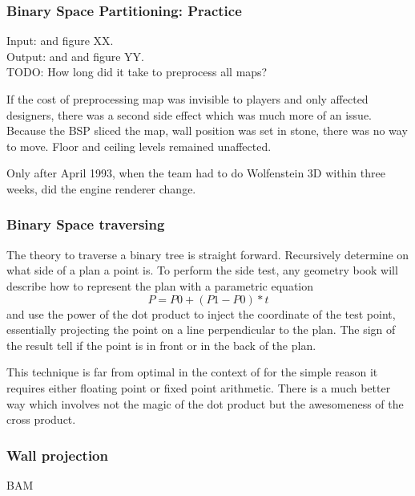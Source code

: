 \subsubsection{Binary Space Partitioning: Practice}
Input: and  figure XX.\\
Output: and  and  figure YY.\\
TODO: How long did it take to preprocess all maps?\\
\par
If the cost of preprocessing map was invisible to players and only affected designers, there was a second side effect which was much more of an issue. Because the BSP sliced the map, wall position was set in stone, there was no way to move. Floor and ceiling levels remained unaffected.\\
\par
Only after April 1993, when the team had to do Wolfenstein 3D within three weeks, did the engine renderer change.\\

\par

\subsubsection{Binary Space traversing}
The theory to traverse a binary tree is straight forward. Recursively determine on what side of a plan a point is. To perform the side test, any geometry book will describe how to represent the plan with a parametric equation $$ P = P0 + (P1 - P0) * t$$
and use the power of the dot product to inject the coordinate of the test point, essentially projecting the point on a line perpendicular to the plan. The sign of the result tell if the point is in front or in the back of the plan.\\
\par
This technique is far from optimal in the context of \doom for the simple reason it requires either floating point or fixed point arithmetic. There is a much better way which involves not the magic of the dot product but the awesomeness of the cross product.\\
\par
{}



\subsubsection{Wall projection}
BAM\\
\par
{}
\par
{}








